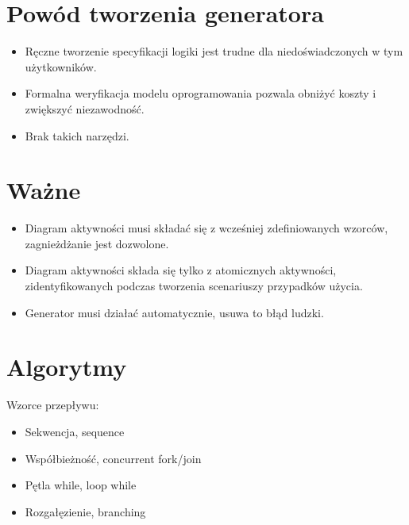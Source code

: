 \documentclass[a4paper, 11pt]{article}
\begin{document}
	\section{Powód tworzenia generatora}
	\begin{itemize}
	\item Ręczne tworzenie specyfikacji logiki jest trudne dla niedoświadczonych w tym użytkowników.
	\item Formalna weryfikacja modelu oprogramowania pozwala obniżyć koszty i zwiększyć niezawodność.
	\item Brak takich narzędzi.
	\end{itemize}
	\section{Ważne}
	\begin{itemize}
	\item Diagram aktywności musi składać się z wcześniej zdefiniowanych wzorców, zagnieżdżanie jest dozwolone.
	\item Diagram aktywności składa się tylko z atomicznych aktywności, zidentyfikowanych podczas tworzenia scenariuszy przypadków użycia.
	\item Generator musi działać automatycznie, usuwa to błąd ludzki.
	\end{itemize}
	\section{Algorytmy}
	
	Wzorce przepływu:
	\begin{itemize}
	\item Sekwencja, sequence
	\item Współbieżność, concurrent fork/join
	\item Pętla while, loop while
	\item Rozgałęzienie, branching
	\end{itemize}
		
\end{document}
